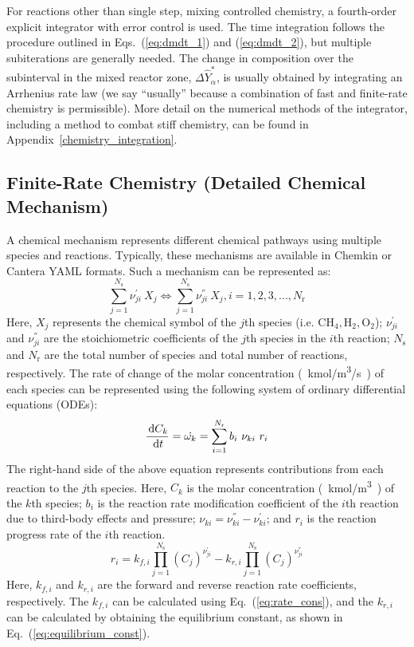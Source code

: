 For reactions other than single step, mixing controlled chemistry, a fourth-order explicit integrator with error control is used. The time integration follows the procedure outlined in Eqs.~(\ref{eq:dmdt_1}) and (\ref{eq:dmdt_2}), but multiple subiterations are generally needed. The change in composition over the subinterval in the mixed reactor zone, $\Delta \hat{Y}_\alpha^*$, is usually obtained by integrating an Arrhenius rate law (we say ``usually'' because a combination of fast and finite-rate chemistry is permissible). More detail on the numerical methods of the integrator, including a method to combat stiff chemistry, can be found in Appendix~\ref{chemistry_integration}.


\subsection{Finite-Rate Chemistry (Detailed Chemical Mechanism)}
\label{detailed_chemistry_using_mechanism}
A chemical mechanism represents different chemical pathways using multiple species and reactions. Typically, these mechanisms are available in Chemkin or Cantera YAML formats. Such a mechanism can be represented as:
\begin{equation}\label{eq:chemistry_mechanism}
\sum_{j=1}^{N_{\text{s}}}{\nu}_{ji}^{'} \ X_j \Leftrightarrow \sum_{j=1}^{N_{\text{s}}}{\nu}_{ji}^{''} \ X_j, i=1,2,3,...,N_\text{r}
\end{equation}
Here, $X_j$ represents the chemical symbol of the $j$th species (i.e. $\mathrm{CH_4, H_2, O_2}$); ${\nu}_{ji}^{'}$ and ${\nu}_{ji}^{''}$ are the stoichiometric coefficients of the $j$th species in the $i$th reaction; ${N_{\text{s}}}$ and ${N_\text{r}}$ are the total number of species and total number of reactions, respectively.
The rate of change of the molar concentration \si{(kmol/m^3/s)} of each species can be represented using the following system of ordinary differential equations (ODEs):
\begin{equation}\label{eq:chemistry_ode_system}
\frac{\d C_k}{\d t} =  \dot{\omega_k} = \sum_{i=1}^{N_\text{r}} b_{i} \ \nu_{ki} \ r_i
\end{equation}
The right-hand side of the above equation represents contributions from each reaction to the $j$th species. Here, $C_k$ is the molar concentration \si {(kmol/m^3)} of the $k$th species; $b_i$ is the reaction rate modification coefficient of the $i$th reaction due to third-body effects and pressure; $\nu_{ki} = {\nu}_{ki}^{''} - {\nu}_{ki}^{'}$; and $r_i$ is the reaction progress rate of the $i$th reaction.
\begin{equation}\label{eq:reaction_progress_rate}
r_i =  k_{f,i} \prod_{j=1}^{N_{\text{s}}} (C_j)^{{\nu}_{ji}^{'}}  -  k_{r,i} \prod_{j=1}^{N_{\text{s}}} (C_j)^{{\nu}_{ji}^{''}}
\end{equation}
Here, $k_{f,i}$ and $k_{r,i}$ are the forward and reverse reaction rate coefficients, respectively. The $k_{f,i}$ can be calculated using Eq.~(\ref{eq:rate_cons}), and the $k_{r,i}$ can be calculated by obtaining the equilibrium constant, as shown in Eq.~(\ref{eq:equilibrium_const}).

